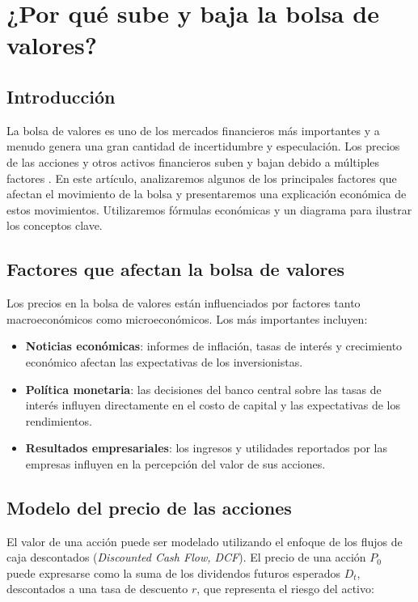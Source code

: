 \chapter{¿Por qué sube y baja la bolsa de valores?}

\section{Introducción}

La bolsa de valores es uno de los mercados financieros más importantes y a menudo genera una gran cantidad de incertidumbre y especulación. Los precios de las acciones y otros activos financieros suben y bajan debido a múltiples factores \parencite{@5287-FREDERIC2018,@5286-ZVI2013}. En este artículo, analizaremos algunos de los principales factores que afectan el movimiento de la bolsa y presentaremos una explicación económica de estos movimientos. Utilizaremos fórmulas económicas y un diagrama para ilustrar los conceptos clave.

\section{Factores que afectan la bolsa de valores}

Los precios en la bolsa de valores están influenciados por factores tanto macroeconómicos como microeconómicos. Los más importantes incluyen:

\begin{itemize}
\item \textbf{Noticias económicas}: informes de inflación, tasas de interés y crecimiento económico afectan las expectativas de los inversionistas.
\item \textbf{Política monetaria}: las decisiones del banco central sobre las tasas de interés influyen directamente en el costo de capital y las expectativas de los rendimientos.
\item \textbf{Resultados empresariales}: los ingresos y utilidades reportados por las empresas influyen en la percepción del valor de sus acciones.
\end{itemize}

\section{Modelo del precio de las acciones}

El valor de una acción puede ser modelado utilizando el enfoque de los flujos de caja descontados (\textit{Discounted Cash Flow, DCF}). El precio de una acción $P_0$ puede expresarse como la suma de los dividendos futuros esperados $D_t$, descontados a una tasa de descuento $r$, que representa el riesgo del activo:

